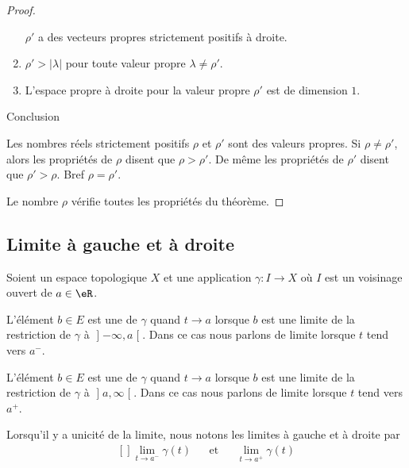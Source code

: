 \begin{proof}
\begin{enumerate}
		      \( \rho'\) a des vecteurs propres strictement positifs à droite.
		\item
		      \( \rho'>| \lambda |\) pour toute valeur propre \( \lambda\neq \rho'\).
		\item
		      L'espace propre à droite pour la valeur propre \( \rho'\) est de dimension \( 1\).
	\end{enumerate}
	\begin{center}
		Conclusion
	\end{center}
	Les nombres réels strictement positifs \( \rho\) et \( \rho'\) sont des valeurs propres. Si \( \rho\neq \rho'\), alors les propriétés de \( \rho\) disent que \( \rho>\rho'\). De même les propriétés de \( \rho'\) disent que \( \rho'>\rho\). Bref \( \rho=\rho'\).

	Le nombre \( \rho\) vérifie toutes les propriétés du théorème.
\end{proof}

\subsection{Limite à gauche et à droite}


\begin{definition}		\label{DEFooIBBQooFEwyMc}
	Soient un espace topologique \( X\) et une application \(\gamma \colon I\to X  \) où \( I\) est un voisinage ouvert de \( a\in \eR\).

	L'élément \( b\in E\) est une  de \( \gamma\) quand \( t\to a\) lorsque \( b\) est une limite de  la restriction de \( \gamma\) à \( \mathopen] -\infty,a\mathclose[\). Dans ce cas nous parlons de limite lorsque \( t\) tend vers \( a^-\).

		L'élément \( b\in E\) est une  de \( \gamma\) quand \( t\to a\) lorsque \( b\) est une limite de  la restriction de \( \gamma\) à \( \mathopen] a,\infty\mathclose[\). Dans ce cas nous parlons de limite lorsque \( t\) tend vers \( a^+\).

	Lorsqu'il y a unicité de la limite, nous notons les limites à gauche et à droite par
	\begin{equation}
		\begin{aligned}[]
			\lim_{t\to a^-}\gamma(t) &  & \text{et} &  & \lim_{t\to a^+}\gamma(t)
		\end{aligned}
	\end{equation}
\end{definition}


